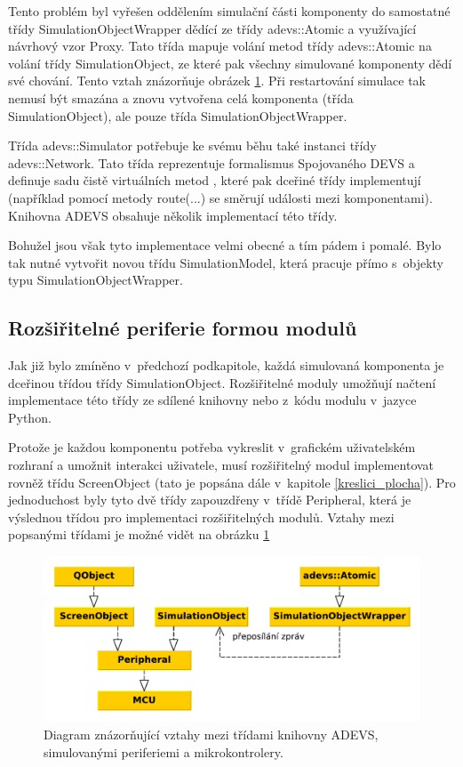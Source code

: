 Tento problém byl vyřešen oddělením simulační části komponenty do samostatné třídy SimulationObjectWrapper dědící ze třídy adevs::Atomic a využívající návrhový vzor Proxy. Tato třída mapuje volání metod třídy adevs::Atomic na volání třídy SimulationObject, ze které pak všechny simulované komponenty dědí
své chování. Tento vztah znázorňuje obrázek \ref{fig:adevs_classes}. Při restartování simulace tak nemusí být smazána a znovu vytvořena celá komponenta (třída SimulationObject), ale pouze třída SimulationObjectWrapper.

Třída adevs::Simulator potřebuje ke svému běhu také instanci třídy adevs::Network. Tato třída reprezentuje formalismus Spojovaného DEVS a definuje sadu čistě virtuálních metod \cite{oop}, které pak dceřiné třídy implementují (například pomocí metody route(...) se směrují události mezi komponentami). Knihovna ADEVS obsahuje několik implementací této třídy.

Bohužel jsou však tyto implementace velmi obecné a tím pádem i pomalé. Bylo tak nutné vytvořit novou třídu SimulationModel, která pracuje přímo s~objekty typu SimulationObjectWrapper.

\subsection{Rozšiřitelné periferie formou modulů}

Jak již bylo zmíněno v~předchozí podkapitole, každá simulovaná komponenta je dceřinou třídou třídy SimulationObject. Rozšiřitelné moduly umožňují načtení implementace této třídy ze sdílené knihovny nebo z~kódu modulu v~jazyce Python.

Protože je každou komponentu potřeba vykreslit v~grafickém uživatelském rozhraní a umožnit interakci uživatele, musí rozšiřitelný modul implementovat rovněž třídu ScreenObject (tato je popsána dále v~kapitole \ref{kreslici_plocha}). Pro jednoduchost byly tyto dvě třídy zapouzdřeny v~třídě Peripheral, která je výslednou třídou pro implementaci rozšiřitelných modulů. Vztahy mezi popsanými třídami je možné vidět na obrázku \ref{fig:adevs_classes}

\begin{figure}[ht]
\centering
\includegraphics[trim=0cm 0cm 0cm 0cm, scale=0.7]{fig/adevs_class}
\caption{Diagram znázorňující vztahy mezi třídami knihovny ADEVS, simulovanými periferiemi a mikrokontrolery.}
\label{fig:adevs_classes}
\end{figure}

